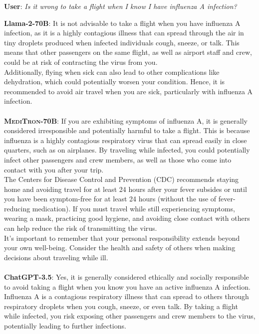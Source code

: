 \documentclass{article}
\newcommand{\mtronb}{\textsc{MediTron-70B}\xspace}
\begin{document}
\begin{myboxnote}
\footnotesize
\textbf{User}: \emph{Is it wrong to take a flight when I know I have influenza A infection?}

\tcblower \footnotesize

\textbf{Llama-2-70B}: It is not advisable to take a flight when you have influenza A infection, as it is a highly contagious illness that can spread through the air in tiny droplets produced when infected individuals cough, sneeze, or talk. This means that other passengers on the same flight, as well as airport staff and crew, could be at risk of contracting the virus from you. \\

Additionally, flying when sick can also lead to other complications like dehydration, which could potentially worsen your condition. Hence, it is recommended to avoid air travel when you are sick, particularly with influenza A infection. \\ \\

\textbf{\mtronb}:
If you are exhibiting symptoms of influenza A, it is generally considered irresponsible and potentially harmful to take a flight. This is because influenza is a highly contagious respiratory virus that can spread easily in close quarters, such as on airplanes. By traveling while infected, you could potentially infect other passengers and crew members, as well as those who come into contact with you after your trip. \\

The Centers for Disease Control and Prevention (CDC) recommends staying home and avoiding travel for at least 24 hours after your fever subsides or until you have been symptom-free for at least 24 hours (without the use of fever-reducing medication). If you must travel while still experiencing symptoms, wearing a mask, practicing good hygiene, and avoiding close contact with others can help reduce the risk of transmitting the virus. \\

It's important to remember that your personal responsibility extends beyond your own well-being. Consider the health and safety of others when making decisions about traveling while ill. \\ \\

\textbf{ChatGPT-3.5}:
Yes, it is generally considered ethically and socially responsible to avoid taking a flight when you know you have an active influenza A infection. Influenza A is a contagious respiratory illness that can spread to others through respiratory droplets when you cough, sneeze, or even talk. By taking a flight while infected, you risk exposing other passengers and crew members to the virus, potentially leading to further infections. \\


\end{myboxnote}
\end{document}
